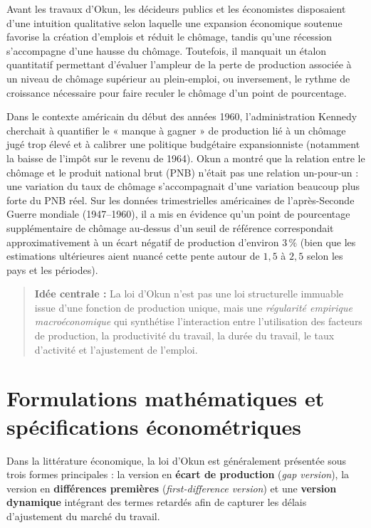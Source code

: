 \documentclass[11pt,a4paper]{article}
\begin{document}
Avant les travaux d'Okun, les décideurs publics et les économistes disposaient d'une intuition qualitative selon laquelle une expansion économique soutenue favorise la création d'emplois et réduit le chômage, tandis qu'une récession s'accompagne d'une hausse du chômage. Toutefois, il manquait un étalon quantitatif permettant d'évaluer l'ampleur de la perte de production associée à un niveau de chômage supérieur au plein-emploi, ou inversement, le rythme de croissance nécessaire pour faire reculer le chômage d'un point de pourcentage.

Dans le contexte américain du début des années 1960, l'administration Kennedy cherchait à quantifier le « manque à gagner » de production lié à un chômage jugé trop élevé et à calibrer une politique budgétaire expansionniste (notamment la baisse de l'impôt sur le revenu de 1964). Okun a montré que la relation entre le chômage et le produit national brut (PNB) n'était pas une relation un-pour-un : une variation du taux de chômage s'accompagnait d'une variation beaucoup plus forte du PNB réel. Sur les données trimestrielles américaines de l'après-Seconde Guerre mondiale (1947--1960), il a mis en évidence qu'un point de pourcentage supplémentaire de chômage au-dessus d'un seuil de référence correspondait approximativement à un écart négatif de production d'environ $3\,\%$ (bien que les estimations ultérieures aient nuancé cette pente autour de $1,5$ à $2,5$ selon les pays et les périodes).

\begin{quote}
\textbf{Idée centrale :} La loi d'Okun n'est pas une loi structurelle immuable issue d'une fonction de production unique, mais une \textit{régularité empirique macroéconomique} qui synthétise l'interaction entre l'utilisation des facteurs de production, la productivité du travail, la durée du travail, le taux d'activité et l'ajustement de l'emploi.
\end{quote}

\section{Formulations mathématiques et spécifications économétriques}

Dans la littérature économique, la loi d'Okun est généralement présentée sous trois formes principales : la version en \textbf{écart de production} (\textit{gap version}), la version en \textbf{différences premières} (\textit{first-difference version}) et une \textbf{version dynamique} intégrant des termes retardés afin de capturer les délais d'ajustement du marché du travail.
\end{document}
